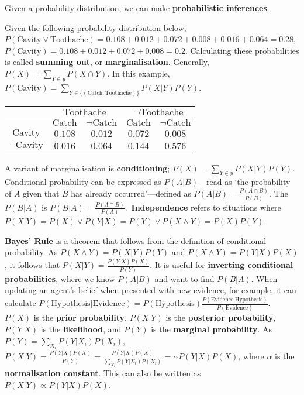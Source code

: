 Given a probability distribution, we can make \textbf{probabilistic inferences}.

\begin{example}
    Given the following probability distribution below, $P(\text{Cavity} \lor \text{Toothache}) = 0.108 + 0.012 + 0.072 + 0.008 + 0.016 + 0.064 = 0.28$, $P(\text{Cavity}) = 0.108 + 0.012 + 0.072 + 0.008 = 0.2$. Calculating these probabilities is called \textbf{summing out}, or \textbf{marginalisation}. Generally, $P(X) = \sum_{Y \in y} P(X \cap Y)$. In this example, $P(\text{Cavity}) = \sum_{Y \in \{ (\text{Catch}, \text{Toothache}) \}} P(X|Y)P(Y)$.\\

    \begin{tabular}{|c|c|c|c|c|}
        \hline
        & \multicolumn{2}{c|}{$\text{Toothache}$} & \multicolumn{2}{c|}{$\neg\text{Toothache}$}\\
        \hline
        & $\text{Catch}$ & $\neg\text{Catch}$ & $\text{Catch}$ & $\neg\text{Catch}$\\
        \hline
        $\text{Cavity}$ & $0.108$ & $0.012$ & $0.072$ & $0.008$\\
        \hline
        $\neg\text{Cavity}$ & $0.016$ & $0.064$ & $0.144$ & $0.576$\\
        \hline
    \end{tabular}
\end{example}

A variant of marginalisation is \textbf{conditioning}; $P(X) = \sum_{Y \in y} P(X|Y)P(Y)$. Conditional probability can be expressed as $P(A | B)$---read as `the probability of $A$ given that $B$ has already occurred'---defined as $P(A | B) = \frac{P(A \cap B)}{P(B)}$. The $P(B | A)$ is $P(B | A) = \frac{P(A \cap B)}{P(A)}$.\ \textbf{Independence} refers to situations where $P(X|Y) = P(X) \lor P(Y|X) = P(Y) \lor P(X \land Y) = P(X)P(Y)$.

\begin{definition}
    \textbf{Bayes' Rule} is a theorem that follows from the definition of conditional probability. As $P(X \land Y) = P(X|Y)P(Y)$ and $P(X \land Y) = P(Y|X)P(X)$, it follows that $P(X | Y) = \frac{P(Y | X)P(X)}{P(Y)}$. It is useful for \textbf{inverting conditional probabilities}, where we know $P(A | B)$ and want to find $P(B | A)$. When updating an agent's belief when presented with new evidence, for example, it can calculate $P(\text{Hypothesis} | \text{Evidence}) = P(\text{Hypothesis}) \frac{P(\text{Evidence} | \text{Hypothesis})}{P(\text{Evidence})}$. $P(X)$ is the \textbf{prior probability}, $P(X|Y)$ is the \textbf{posterior probability}, $P(Y|X)$ is the \textbf{likelihood}, and $P(Y)$ is the \textbf{marginal probability}. As $P(Y) = \sum_{X_{i}} P(Y|X_{i}) P(X_{i})$, $P(X|Y) = \frac{P(Y|X)P(X)}{P(Y)} = \frac{P(Y|X)P(X)}{\sum_{X_{i}} P(Y|X_{i})P(X_{i})} = \alpha P(Y|X) P(X)$, where $\alpha$ is the \textbf{normalisation constant}. This can also be written as $P(X|Y) \propto P(Y|X)P(X)$.
\end{definition}

